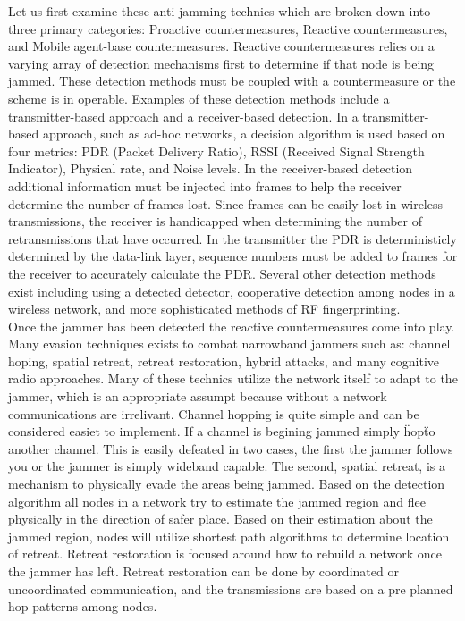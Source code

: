 \documentclass[11pt]{mvlthesis}
\begin{document}
Let us first examine these anti-jamming technics which are broken down into three primary categories: Proactive countermeasures, Reactive countermeasures, and Mobile agent-base countermeasures\cite{1}.  Reactive countermeasures relies on a varying array of detection mechanisms first to determine if that node is being jammed.  These detection methods  must be coupled with a countermeasure or the scheme is in operable.  Examples of these detection methods include a transmitter-based approach and a receiver-based detection.  In a transmitter-based approach, such as ad-hoc networks, a decision algorithm is used based on four metrics: PDR (Packet Delivery Ratio), RSSI (Received Signal Strength Indicator), Physical rate, and Noise levels\cite{3}.  In the receiver-based detection additional information must be injected into frames to help the receiver determine the number of frames lost.  Since frames can be easily lost in wireless transmissions, the receiver is handicapped when determining the number of retransmissions that have occurred.  In the transmitter the PDR is deterministicly determined by the data-link layer, sequence numbers must be added to frames for the receiver to accurately calculate the PDR\cite{3}.  Several other detection methods exist including using a detected detector, cooperative detection among nodes in a wireless network, and more sophisticated methods of RF fingerprinting\cite{3}.\\

Once the jammer has been detected the reactive countermeasures come into play.  Many evasion techniques exists to combat narrowband jammers such as: channel hoping, spatial retreat, retreat restoration, hybrid attacks, and many cognitive radio approaches\cite{2}.  Many of these technics utilize the network itself to adapt to the jammer, which is an appropriate assumpt because without a network communications are irrelivant.  Channel hopping is quite simple and can be considered easiet to implement.  If a channel is begining jammed simply \"hop\" to another channel.  This is easily defeated in two cases, the first the jammer follows you or the jammer is simply wideband capable.  The second, spatial retreat, is a mechanism to physically evade the areas being jammed. Based on the detection algorithm all nodes in a network try to estimate the jammed region and flee physically in the direction of safer place. Based on their estimation about the jammed region, nodes will utilize shortest path algorithms to determine location of retreat\cite{5}.  Retreat restoration is focused around how to rebuild a network once the jammer has left.  Retreat restoration can be done by coordinated or uncoordinated communication, and the transmissions are based on a pre planned hop patterns among nodes\cite{6}.\\
\end{document}
